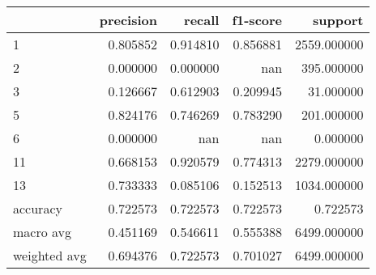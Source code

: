 \begin{tabular}{lrrrr}
\toprule
 & precision & recall & f1-score & support \\
\midrule
1 & 0.805852 & 0.914810 & 0.856881 & 2559.000000 \\
2 & 0.000000 & 0.000000 & nan & 395.000000 \\
3 & 0.126667 & 0.612903 & 0.209945 & 31.000000 \\
5 & 0.824176 & 0.746269 & 0.783290 & 201.000000 \\
6 & 0.000000 & nan & nan & 0.000000 \\
11 & 0.668153 & 0.920579 & 0.774313 & 2279.000000 \\
13 & 0.733333 & 0.085106 & 0.152513 & 1034.000000 \\
accuracy & 0.722573 & 0.722573 & 0.722573 & 0.722573 \\
macro avg & 0.451169 & 0.546611 & 0.555388 & 6499.000000 \\
weighted avg & 0.694376 & 0.722573 & 0.701027 & 6499.000000 \\
\bottomrule
\end{tabular}
